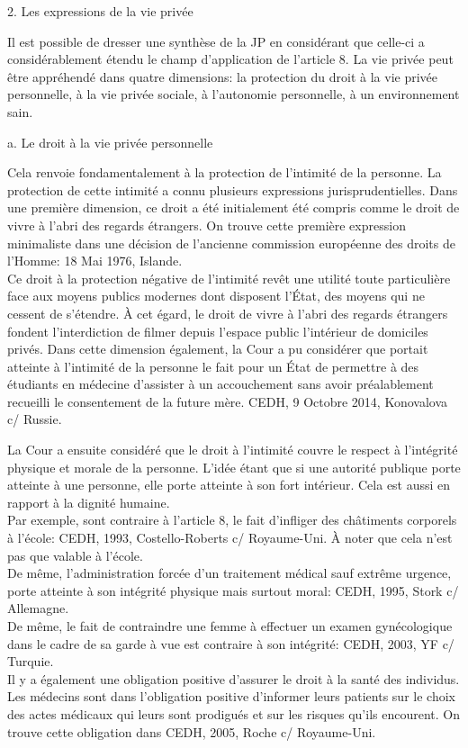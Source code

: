 \documentclass[10pt, a4paper, openany]{book}
\begin{document}
2. Les expressions de la vie privée


Il est possible de dresser une synthèse de la JP en considérant que celle-ci a considérablement étendu le champ d'application de l'article 8. La vie privée peut être appréhendé dans quatre dimensions: la protection du droit à la vie privée personnelle, à la vie privée sociale, à l'autonomie personnelle, à un environnement sain.


a. Le droit à la vie privée personnelle 


Cela renvoie fondamentalement à la protection de l'intimité de la personne. La protection de cette intimité a connu plusieurs expressions jurisprudentielles. Dans une première dimension, ce droit a été initialement été compris comme le droit de vivre à l'abri des regards étrangers. On trouve cette première expression minimaliste dans une décision de l'ancienne commission européenne des droits de l'Homme: 18 Mai 1976, Islande. \\
Ce droit à la protection négative de l'intimité revêt une utilité toute particulière face aux moyens publics modernes dont disposent l'État, des moyens qui ne cessent de s'étendre. À cet égard, le droit de vivre à l'abri des regards étrangers fondent l'interdiction de filmer depuis l'espace public l'intérieur de domiciles privés. Dans cette dimension également, la Cour a pu considérer que portait atteinte à l'intimité de la personne le fait pour un État de permettre à des étudiants en médecine d'assister à un accouchement sans avoir préalablement recueilli le consentement de la future mère. CEDH, 9 Octobre 2014, Konovalova c/ Russie. 


La Cour a ensuite considéré que le droit à l'intimité couvre le respect à l'intégrité physique et morale de la personne. L'idée étant que si une autorité publique porte atteinte à une personne, elle porte atteinte à son fort intérieur. Cela est aussi en rapport à la dignité humaine. \\
Par exemple, sont contraire à l'article 8, le fait d'infliger des châtiments corporels à l'école: CEDH, 1993, Costello-Roberts c/ Royaume-Uni. À noter que cela n'est pas que valable à l'école. \\
De même, l'administration forcée d'un traitement médical sauf extrême urgence, porte atteinte à son intégrité physique mais surtout moral: CEDH, 1995, Stork c/ Allemagne. \\
De même, le fait de contraindre une femme à effectuer un examen gynécologique dans le cadre de sa garde à vue est contraire à son intégrité: CEDH, 2003, YF c/ Turquie. \\
Il y a également une obligation positive d'assurer le droit à la santé des individus. Les médecins sont dans l'obligation positive d'informer leurs patients sur le choix des actes médicaux qui leurs sont prodigués et sur les risques qu'ils encourent. On trouve cette obligation dans CEDH, 2005, Roche c/ Royaume-Uni. 
\end{document}
